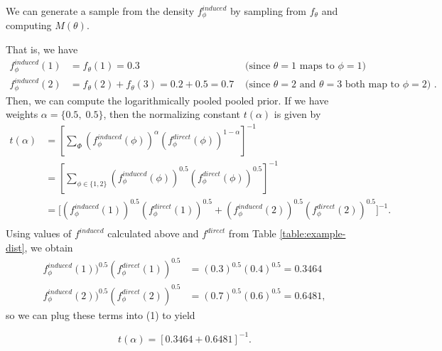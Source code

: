 \documentclass[12pt,twoside]{smiththesis}
\begin{document}
We can generate a sample from the density \(f_\phi^{induced}\) by sampling from \(f_\theta\) and computing \(M(\theta)\).

That is, we have
\begin{align*}
f_\phi^{induced}(1) &= f_{\theta}(1) = 0.3 & \text{ (since $\theta = 1$ maps to $\phi = 1$) } \\
f_\phi^{induced}(2) &= f_{\theta}(2) +  f_{\theta}(3) = 0.2 + 0.5=  0.7 & \text{ (since $\theta = 2$ and $\theta=3$ both map to $\phi = 2$) .}
\end{align*}
Then, we can compute the logarithmically pooled pooled prior. If we have weights \(\alpha=\{0.5,\;0.5\}\), then the normalizing constant \(t(\alpha)\) is given by
\begin{align*} 
t(\alpha) &= \left[ \sum_\Phi  (f_\phi^{induced}(\phi))^{\alpha} (f_\phi^{direct}(\phi))^{1-\alpha} \right]^{-1} \\
&=  \left[ \sum_{\phi \in \{1,2\}}  (f_\phi^{induced}(\phi))^{0.5} (f_\phi^{direct}(\phi))^{0.5} \right]^{-1} \\
&= \Big[ (f_\phi^{induced}(1))^{0.5} (f_\phi^{direct}(1))^{0.5} + (f_\phi^{induced}(2))^{0.5} (f_\phi^{direct}(2))^{0.5} \Big]^{-1} . \tag{1}\\
\end{align*}
\noindent Using values of \(f^{induced}\) calculated above and \(f^{direct}\) from Table \ref{table:example-dist}, we obtain
\begin{align*}
f_\phi^{induced}(1))^{0.5} (f_\phi^{direct}(1))^{0.5}&= (0.3)^{0.5}(0.4)^{0.5} =0.3464\\
f_\phi^{induced}(2))^{0.5} (f_\phi^{direct}(2))^{0.5} &= (0.7)^{0.5} (0.6)^{0.5}=0.6481,
\end{align*}
\noindent so we can plug these terms into (1) to yield

\[ t(\alpha) = [0.3464 +0.6481 ]^{-1}. \]
\end{document}
